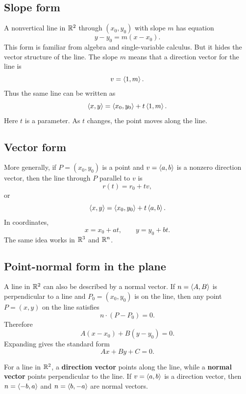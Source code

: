 \subsection{Slope form}

A nonvertical line in $\mathbb{R}^2$ through $(x_0,y_0)$ with slope $m$ has equation
\[
  y-y_0=m(x-x_0).
\]
This form is familiar from algebra and single-variable calculus. But it hides the vector structure of the line. The slope $m$ means that a direction vector for the line is
\[
  v=\left\langle 1,m\right\rangle.
\]
Thus the same line can be written as
\[
  \left\langle x,y\right\rangle=\left\langle x_0,y_0\right\rangle+t\left\langle 1,m\right\rangle.
\]
Here $t$ is a parameter. As $t$ changes, the point moves along the line.

\subsection{Vector form}

More generally, if $P=(x_0,y_0)$ is a point and $v=\left\langle a,b\right\rangle$ is a nonzero direction vector, then the line through $P$ parallel to $v$ is
\[
  r(t)=r_0+tv,
\]
or
\[
  \left\langle x,y\right\rangle=\left\langle x_0,y_0\right\rangle+t\left\langle a,b\right\rangle.
\]
In coordinates,
\[
  x=x_0+at,\qquad y=y_0+bt.
\]
The same idea works in $\mathbb{R}^3$ and $\mathbb{R}^n$.

\subsection{Point-normal form in the plane}

A line in $\mathbb{R}^2$ can also be described by a normal vector. If $n=\left\langle A,B\right\rangle$ is perpendicular to a line and $P_0=(x_0,y_0)$ is on the line, then any point $P=(x,y)$ on the line satisfies
\[
  n\cdot(P-P_0)=0.
\]
Therefore
\[
  A(x-x_0)+B(y-y_0)=0.
\]
Expanding gives the standard form
\[
  Ax+By+C=0.
\]

\begin{notebox}
For a line in $\mathbb{R}^2$, a \textbf{direction vector} points along the line, while a \textbf{normal vector} points perpendicular to the line. If $v=\left\langle a,b\right\rangle$ is a direction vector, then $n=\left\langle -b,a\right\rangle$ and $n=\left\langle b,-a\right\rangle$ are normal vectors.
\end{notebox}


